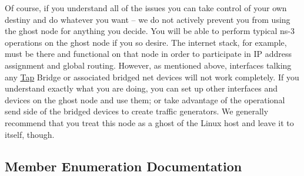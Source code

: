 Of course, if you understand all of the issues you can take control of your own destiny and do whatever you want -- we do not actively prevent you from using the ghost node for anything you decide. You will be able to perform typical ns-\/3 operations on the ghost node if you so desire. The internet stack, for example, must be there and functional on that node in order to participate in IP address assignment and global routing. However, as mentioned above, interfaces talking any \hyperlink{classns3_1_1Tap}{Tap} Bridge or associated bridged net devices will not work completely. If you understand exactly what you are doing, you can set up other interfaces and devices on the ghost node and use them; or take advantage of the operational send side of the bridged devices to create traffic generators. We generally recommend that you treat this node as a ghost of the Linux host and leave it to itself, though. 

\subsection{Member Enumeration Documentation}
